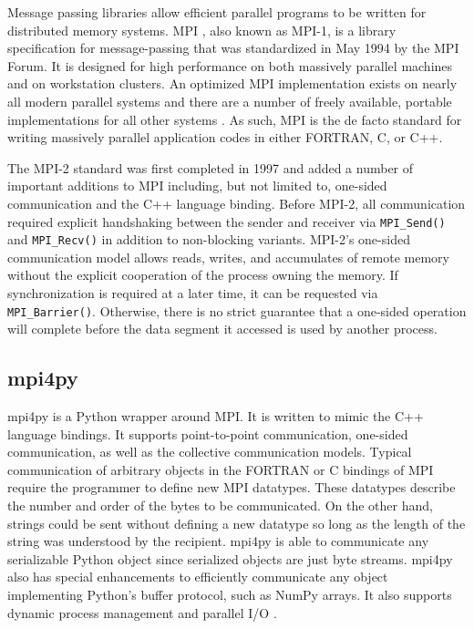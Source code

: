 \documentclass{sigplanconf}
\begin{document}
Message passing libraries allow efficient parallel programs to be written for
distributed memory systems. MPI \cite{Gro99a}, also known as MPI-1, is a
library specification for message-passing that was standardized in May 1994 by
the MPI Forum. It is designed for high performance on both massively parallel
machines and on workstation clusters. An optimized MPI implementation exists
on nearly all modern parallel systems and there are a number of freely
available, portable implementations for all other systems \cite{Buy99}.  As
such, MPI is the de facto standard for writing massively parallel application
codes in either FORTRAN, C, or C++.

The MPI-2 standard \cite{Gro99b} was first completed in 1997 and added a
number of important additions to MPI including, but not limited to, one-sided
communication and the C++ language binding. Before MPI-2, all communication
required explicit handshaking between the sender and receiver via
\verb=MPI_Send()= and \verb=MPI_Recv()= in addition to non-blocking variants.
MPI-2’s one-sided communication model allows reads, writes, and accumulates of
remote memory without the explicit cooperation of the process owning the
memory. If synchronization is required at a later time, it can be requested
via \verb=MPI_Barrier()=. Otherwise, there is no strict guarantee that a
one-sided operation will complete before the data segment it accessed is used
by another process.

\subsection{mpi4py}

mpi4py is a Python wrapper around MPI. It is written to mimic the C++ language
bindings. It supports point-to-point communication, one-sided communication,
as well as the collective communication models. Typical communication of
arbitrary objects in the FORTRAN or C bindings of MPI require the programmer
to define new MPI datatypes. These datatypes describe the number and order of
the bytes to be communicated. On the other hand, strings could be sent without
defining a new datatype so long as the length of the string was understood by
the recipient.  mpi4py is able to communicate any serializable Python object
since serialized objects are just byte streams. mpi4py also has special
enhancements to efficiently communicate any object implementing Python’s
buffer protocol, such as NumPy arrays. It also supports dynamic process
management and parallel I/O \cite{Dal05,Dal08}.
\end{document}
